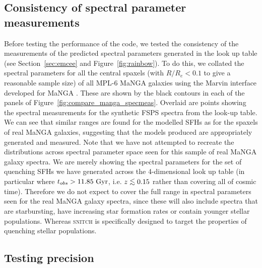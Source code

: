 \documentclass[useAMS,usenatbib]{mn2e}
\def\lesssim{\mathrel{\hbox{\rlap{\hbox{\lower3pt\hbox{$\sim$}}}\hbox{\raise2pt\hbox{$<$}}}}}
\begin{document}
\subsection{Consistency of spectral parameter measurements}\label{sec:precisiontest}


Before testing the performance of the code, we tested the consistency of the measurements of the predicted spectral parameters generated in the look up table (see Section~\ref{sec:emcee} and Figure~\ref{fig:rainbow}). To do this, we collated the spectral parameters for all the central spaxels (with $R/R_e < 0.1$ to give a reasonable sample size) of all MPL-6 MaNGA galaxies using the Marvin interface developed for MaNGA \citep{cherinka18}. These are shown by the black contours in each of the panels of Figure~\ref{fig:compare_manga_specmeas}. Overlaid are points showing the spectral measurements for the synthetic FSPS spectra from the look-up table. We can see that similar ranges are found for the modelled SFHs as for the spaxels of real MaNGA galaxies, suggesting that the models produced are appropriately generated and measured. Note that we have not attempted to recreate the distributions across spectral parameter space seen for this sample of real MaNGA galaxy spectra. We are merely showing the spectral parameters for the set of quenching SFHs we have generated across the 4-dimensional look up table (in particular where $t_{obs} > 11.85~\rm{Gyr}$, i.e. $z \lesssim 0.15$ rather than covering all of cosmic time). Therefore we do not expect to cover the full range in spectral parameters seen for the real MaNGA galaxy spectra, since these will also include spectra that are starbursting, have increasing star formation rates or contain younger stellar populations. Whereas \textsc{snitch} is specifically designed to target the properties of quenching stellar populations. 


\subsection{Testing precision}\label{sec:precisiontest}

\end{document}
